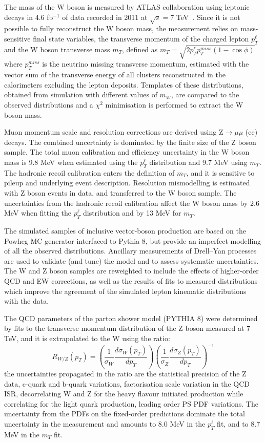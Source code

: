 \documentclass{moriond}
\begin{document}
The mass of the W boson is measured by ATLAS collaboration using
leptonic decays in 4.6 fb$^{-1}$ of data recorded in 2011 at
$\sqrt{s}=7$ TeV~\cite{Aaboud:2017svj}. Since it is not possible to
fully reconstruct the W boson mass, the measurement relies on
mass-sensitive final state variables, the transverse momentum of the
charged lepton $p_T^\ell$ and the W boson transverse mass $m_T$,
defined as $m_T = \sqrt{2p_T^\ell p_T^{miss}(1-\cos\phi)}$ where
$p_T^{miss}$ is the neutrino missing transverse momentum, estimated
with the vector sum of the transverse energy of all clusters
reconstructed in the calorimeters excluding the lepton
deposits. Templates of these distributions, obtained from simulation
with different values of $m_W$, are compared to the observed
distributions and a $\chi^2$ minimisation is performed to extract the
W boson mass.

Muon momentum scale and resolution corrections
are derived using Z$\to\mu\mu$ (ee) decays.  The combined uncertainty
is dominated by the finite size of the Z boson sample.  The total muon
calibration and efficiency uncertainty in the W boson mass is 9.8 MeV
when estimated using the $p_T^{\ell}$ distribution and 9.7 MeV using
$m_T$.  The hadronic recoil calibration enters the definition of
$m_T$, and it is sensitive to pileup and underlying event
description. Resolution mismodelling is estimated with Z boson events
in data, and transferred to the W boson sample. The uncertainties from
the hadronic recoil calibration affect the W boson mass by 2.6 MeV
when fitting the $p_T^\ell$ distribution and by 13 MeV for $m_T$.

The simulated samples of inclusive vector-boson production are based
on the Powheg MC generator interfaced to Pythia 8, but provide an
imperfect modelling of all the observed distributions. Ancillary
measurements of Drell–Yan processes are used to validate (and tune)
the model and to assess systematic uncertainties. The W and Z boson
samples are reweighted to include the effects of higher-order QCD and
EW corrections, as well as the results of fits to measured
distributions which improve the agreement of the simulated lepton
kinematic distributions with the data. 

The QCD parameters of the parton shower model (PYTHIA 8) were
determined by fits to the transverse momentum distribution of the Z
boson measured at 7 TeV, and it is extrapolated to the W using the
ratio:
\begin{equation}
  R_{W/Z} (p_T) = \left(\frac{1}{\sigma_W}\frac{d\sigma_W(p_T)}{dp_T}\right)
  \left(\frac{1}{\sigma_Z}\frac{d\sigma_Z(p_T)}{dp_T}\right)^{-1}
\label{eqn:wzprop}
\end{equation}
the uncertainties propagated in the ratio are the statistical
precision of the Z data, c-quark and b-quark variations, factorisation
scale variation in the QCD ISR, decorrelating W and Z for the heavy
flavour initiated production while correlating for the light quark
production, leading order PS PDF variations. The uncertainty from the
PDFs on the fixed-order predictions dominate the total uncertainty in
the measurement and amounts to 8.0 MeV in the $p_T^\ell$ fit, and to
8.7 MeV in the $m_T$ fit.
\end{document}
